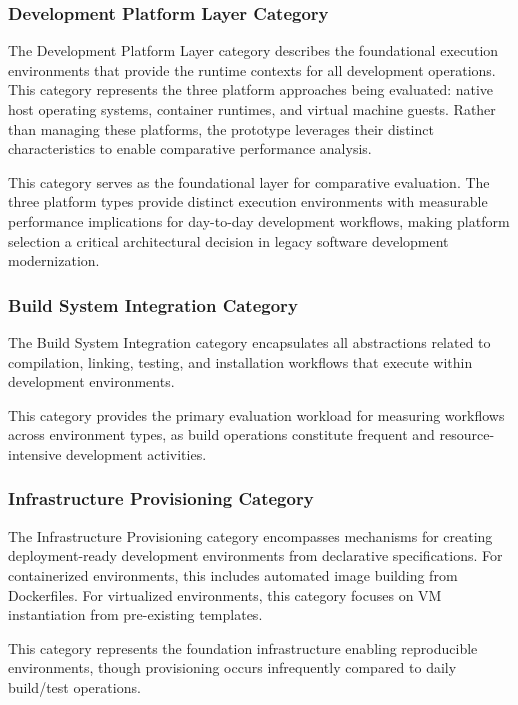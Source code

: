 \subsubsection{Development Platform Layer Category}

The Development Platform Layer category describes the foundational execution environments that provide the runtime contexts for all development operations.
This category represents the three platform approaches being evaluated: native host operating systems, container runtimes, and virtual machine guests.
Rather than managing these platforms, the prototype leverages their distinct characteristics to enable comparative performance analysis.

This category serves as the foundational layer for comparative evaluation.
The three platform types provide distinct execution environments with measurable performance implications for day-to-day development workflows, making platform selection a critical architectural decision in legacy software development modernization.

\subsubsection{Build System Integration Category}

The Build System Integration category encapsulates all abstractions related to compilation, linking, testing, and installation workflows that execute within development environments.

This category provides the primary evaluation workload for measuring workflows across environment types, as build operations constitute frequent and resource-intensive development activities.

\subsubsection{Infrastructure Provisioning Category}

The Infrastructure Provisioning category encompasses mechanisms for creating deployment-ready development environments from declarative specifications.
For containerized environments, this includes automated image building from Dockerfiles.
For virtualized environments, this category focuses on VM instantiation from pre-existing templates.

This category represents the foundation infrastructure enabling reproducible environments, though provisioning occurs infrequently compared to daily build/test operations.


